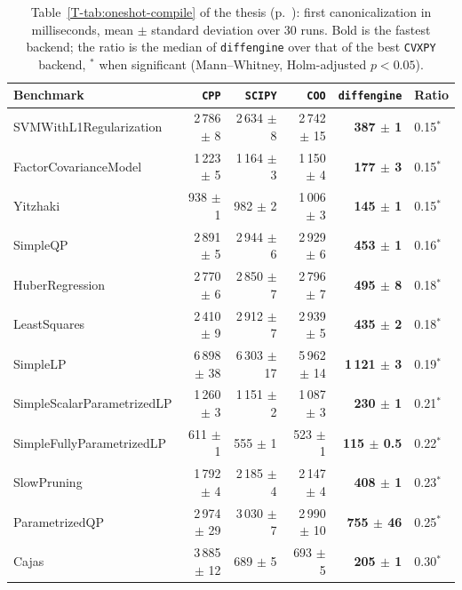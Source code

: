 \documentclass[letterpaper,12pt]{article}
\newcommand{\tpage}[1]{p.~\pageref{T-#1}}
\begin{document}
\begin{table}[htbp]
\centering
\caption{Table~\ref{T-tab:oneshot-compile} of the thesis (\tpage{tab:oneshot-compile}):
first canonicalization in milliseconds, mean $\pm$ standard deviation over $30$ runs. Bold is
the fastest backend; the ratio is the median of \texttt{diffengine} over that of the best
\texttt{CVXPY} backend, $^{*}$ when significant (Mann--Whitney, Holm-adjusted $p < 0.05$).}
\label{tab:res-oneshot}
{\footnotesize
\setlength{\tabcolsep}{3pt}
\begin{tabular}{l r r r r l}
\toprule
Benchmark & \texttt{CPP} & \texttt{SCIPY} & \texttt{COO} & \texttt{diffengine} & Ratio \\
\midrule
SVMWithL1Regularization     & 2\,786 $\pm$ 8 & 2\,634 $\pm$ 8 & 2\,742 $\pm$ 15 & \textbf{387 $\pm$ 1} & 0.15$^{*}$ \\
FactorCovarianceModel       & 1\,223 $\pm$ 5 & 1\,164 $\pm$ 3 & 1\,150 $\pm$ 4 & \textbf{177 $\pm$ 3} & 0.15$^{*}$ \\
Yitzhaki                    & 938 $\pm$ 1 & 982 $\pm$ 2 & 1\,006 $\pm$ 3 & \textbf{145 $\pm$ 1} & 0.15$^{*}$ \\
SimpleQP                    & 2\,891 $\pm$ 5 & 2\,944 $\pm$ 6 & 2\,929 $\pm$ 6 & \textbf{453 $\pm$ 1} & 0.16$^{*}$ \\
HuberRegression             & 2\,770 $\pm$ 6 & 2\,850 $\pm$ 7 & 2\,796 $\pm$ 7 & \textbf{495 $\pm$ 8} & 0.18$^{*}$ \\
LeastSquares                & 2\,410 $\pm$ 9 & 2\,912 $\pm$ 7 & 2\,939 $\pm$ 5 & \textbf{435 $\pm$ 2} & 0.18$^{*}$ \\
SimpleLP                    & 6\,898 $\pm$ 38 & 6\,303 $\pm$ 17 & 5\,962 $\pm$ 14 & \textbf{1\,121 $\pm$ 3} & 0.19$^{*}$ \\
SimpleScalarParametrizedLP  & 1\,260 $\pm$ 3 & 1\,151 $\pm$ 2 & 1\,087 $\pm$ 3 & \textbf{230 $\pm$ 1} & 0.21$^{*}$ \\
SimpleFullyParametrizedLP   & 611 $\pm$ 1 & 555 $\pm$ 1 & 523 $\pm$ 1 & \textbf{115 $\pm$ 0.5} & 0.22$^{*}$ \\
SlowPruning                 & 1\,792 $\pm$ 4 & 2\,185 $\pm$ 4 & 2\,147 $\pm$ 4 & \textbf{408 $\pm$ 1} & 0.23$^{*}$ \\
ParametrizedQP              & 2\,974 $\pm$ 29 & 3\,030 $\pm$ 7 & 2\,990 $\pm$ 10 & \textbf{755 $\pm$ 46} & 0.25$^{*}$ \\
Cajas                       & 3\,885 $\pm$ 12 & 689 $\pm$ 5 & 693 $\pm$ 5 & \textbf{205 $\pm$ 1} & 0.30$^{*}$ \\

\end{tabular}}
\end{table}
\end{document}

